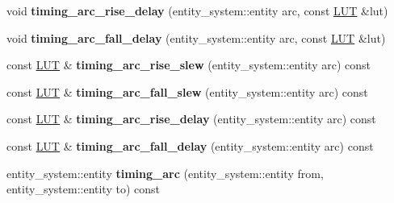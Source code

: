 \begin{DoxyCompactItemize}
\item 
\hypertarget{classophidian_1_1timing_1_1library_a17851f8a3c0e42babdbca5f571193ec2}{void {\bfseries timing\-\_\-arc\-\_\-rise\-\_\-delay} (entity\-\_\-system\-::entity arc, const \hyperlink{classophidian_1_1timing_1_1lookup__table}{L\-U\-T} \&lut)}\label{classophidian_1_1timing_1_1library_a17851f8a3c0e42babdbca5f571193ec2}

\item 
\hypertarget{classophidian_1_1timing_1_1library_a0b2a0698fb268ae86c0aea31c35135bb}{void {\bfseries timing\-\_\-arc\-\_\-fall\-\_\-delay} (entity\-\_\-system\-::entity arc, const \hyperlink{classophidian_1_1timing_1_1lookup__table}{L\-U\-T} \&lut)}\label{classophidian_1_1timing_1_1library_a0b2a0698fb268ae86c0aea31c35135bb}

\item 
\hypertarget{classophidian_1_1timing_1_1library_a8265d28576cb26f32047edecc190865d}{const \hyperlink{classophidian_1_1timing_1_1lookup__table}{L\-U\-T} \& {\bfseries timing\-\_\-arc\-\_\-rise\-\_\-slew} (entity\-\_\-system\-::entity arc) const }\label{classophidian_1_1timing_1_1library_a8265d28576cb26f32047edecc190865d}

\item 
\hypertarget{classophidian_1_1timing_1_1library_a35e0f0949268a94e541a68ae651650c5}{const \hyperlink{classophidian_1_1timing_1_1lookup__table}{L\-U\-T} \& {\bfseries timing\-\_\-arc\-\_\-fall\-\_\-slew} (entity\-\_\-system\-::entity arc) const }\label{classophidian_1_1timing_1_1library_a35e0f0949268a94e541a68ae651650c5}

\item 
\hypertarget{classophidian_1_1timing_1_1library_ac2d566c88c779b2cc9bcd919c55ea5fc}{const \hyperlink{classophidian_1_1timing_1_1lookup__table}{L\-U\-T} \& {\bfseries timing\-\_\-arc\-\_\-rise\-\_\-delay} (entity\-\_\-system\-::entity arc) const }\label{classophidian_1_1timing_1_1library_ac2d566c88c779b2cc9bcd919c55ea5fc}

\item 
\hypertarget{classophidian_1_1timing_1_1library_aea9c27975636b5c400d08f5171f63697}{const \hyperlink{classophidian_1_1timing_1_1lookup__table}{L\-U\-T} \& {\bfseries timing\-\_\-arc\-\_\-fall\-\_\-delay} (entity\-\_\-system\-::entity arc) const }\label{classophidian_1_1timing_1_1library_aea9c27975636b5c400d08f5171f63697}

\item 
\hypertarget{classophidian_1_1timing_1_1library_a4d540a7e0a0c51995df6e7af46fbd473}{entity\-\_\-system\-::entity {\bfseries timing\-\_\-arc} (entity\-\_\-system\-::entity from, entity\-\_\-system\-::entity to) const }\label{classophidian_1_1timing_1_1library_a4d540a7e0a0c51995df6e7af46fbd473}


\end{DoxyCompactItemize}
